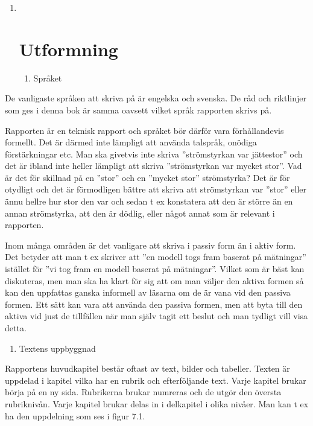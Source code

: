 \begin{enumerate}
\def\labelenumi{\arabic{enumi}.}
\item ~
  \section{Utformning }\label{utformning}

  \begin{enumerate}
  \def\labelenumii{\arabic{enumii}.}
  \item
    Språket
  \end{enumerate}
\end{enumerate}

De vanligaste språken att skriva på är engelska och svenska. De råd och
riktlinjer som ges i denna bok är samma oavsett vilket språk rapporten
skrivs på.

Rapporten är en teknisk rapport och språket bör därför vara
förhållandevis formellt. Det är därmed inte lämpligt att använda
talspråk, onödiga förstärkningar etc. Man ska givetvis inte skriva
''strömstyrkan var jättestor'' och det är ibland inte heller lämpligt
att skriva ''strömstyrkan var mycket stor''. Vad är det för skillnad på
en ''stor'' och en ''mycket stor'' strömstyrka? Det är för otydligt och
det är förmodligen bättre att skriva att strömstyrkan var ''stor'' eller
ännu hellre hur stor den var och sedan t ex konstatera att den är större
än en annan strömstyrka, att den är dödlig, eller något annat som är
relevant i rapporten.

Inom många områden är det vanligare att skriva i passiv form än i aktiv
form. Det betyder att man t ex skriver att ''en modell togs fram baserat
på mätningar'' istället för ''vi tog fram en modell baserat på
mätningar''. Vilket som är bäst kan diskuteras, men man ska ha klart för
sig att om man väljer den aktiva formen så kan den uppfattas ganska
informell av läsarna om de är vana vid den passiva formen. Ett sätt kan
vara att använda den passiva formen, men att byta till den aktiva vid
just de tillfällen när man själv tagit ett beslut och man tydligt vill
visa detta.

\begin{enumerate}
\def\labelenumi{\arabic{enumi}.}
\item
  Textens uppbyggnad
\end{enumerate}

Rapportens huvudkapitel består oftast av text, bilder och tabeller.
Texten är uppdelad i kapitel vilka har en rubrik och efterföljande text.
Varje kapitel brukar börja på en ny sida. Rubrikerna brukar numreras och
de utgör den översta rubriknivån. Varje kapitel brukar delas in i
delkapitel i olika nivåer. Man kan t ex ha den uppdelning som ses i
figur 7.1.

